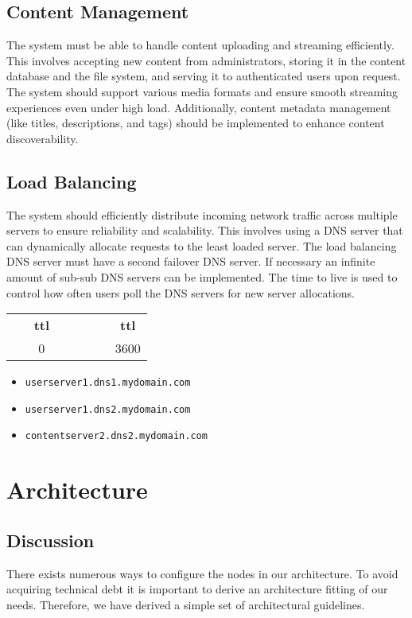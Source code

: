 \documentclass[12pt]{article}
\begin{document}
\subsection{Content Management}
The system must be able to handle content uploading and streaming efficiently. 
This involves accepting new content from administrators, 
storing it in the content database and the file system, 
and serving it to authenticated users upon request. 
The system should support various media formats and ensure smooth streaming experiences even under high load. 
Additionally, content metadata management (like titles, descriptions, and tags) 
should be implemented to enhance content discoverability.

\subsection{Load Balancing}
The system should efficiently distribute incoming network traffic across multiple 
servers to ensure reliability and scalability. 
This involves using a DNS server that can dynamically allocate 
requests to the least loaded server. The load balancing DNS server
must have a second failover DNS server. If necessary an infinite amount of 
sub-sub DNS servers can be implemented. The time to live is used to control how often users poll the DNS servers for
new server allocations.

\begin{tabular}{c c}
~ ~ \textbf{ttl} & ~ ~ ~ ~ ~ \textbf{ttl} \\
~ ~ 0 & ~ ~ ~ ~ ~ 3600 \\
\end{tabular}

    
\begin{itemize}
    \item \texttt{userserver1.dns1.mydomain.com}
    \item \texttt{userserver1.dns2.mydomain.com}
    \item \texttt{contentserver2.dns2.mydomain.com}
\end{itemize}


\section{Architecture}

\subsection{Discussion}
There exists numerous ways to configure the nodes in our architecture. 
To avoid acquiring technical debt it is
important to derive an architecture fitting of our needs.
Therefore, we have derived a simple set of architectural guidelines.
\end{document}
